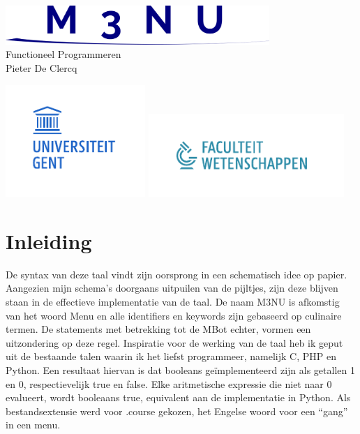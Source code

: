 \documentclass[12pt,a4paper]{report}
\begin{document}

\vspace*{\fill}
\begin{center}
\includegraphics[width=100mm]{verslag/logo.png}
\vspace*{1.5in}\\
  {\Huge Functioneel Programmeren}\\
  {\Large Pieter De Clercq}
\end{center}
\vspace*{\fill}
\begin{center}
\includegraphics[width=53mm]{verslag/logo-ugent.pdf}
\includegraphics[width=74mm]{verslag/logo-we.pdf}
\end{center}
\tableofcontents
\newpage
\chapter{Inleiding}
De syntax van deze taal vindt zijn oorsprong in een schematisch idee op papier. Aangezien mijn schema's doorgaans uitpuilen van de pijltjes, zijn deze blijven staan in de effectieve implementatie van de taal. De naam M3NU is afkomstig van het woord Menu en alle identifiers en keywords zijn gebaseerd op culinaire termen. De statements met betrekking tot de MBot echter, vormen een uitzondering op deze regel. Inspiratie voor de werking van de taal heb ik geput uit de bestaande talen waarin ik het liefst programmeer, namelijk C, PHP en Python. Een resultaat hiervan is dat booleans geïmplementeerd zijn als getallen 1 en 0, respectievelijk true en false. Elke aritmetische expressie die niet naar 0 evalueert, wordt booleaans true, equivalent aan de implementatie in Python. Als bestandsextensie werd voor .course gekozen, het Engelse woord voor een ``gang'' in een menu.
\end{document}
